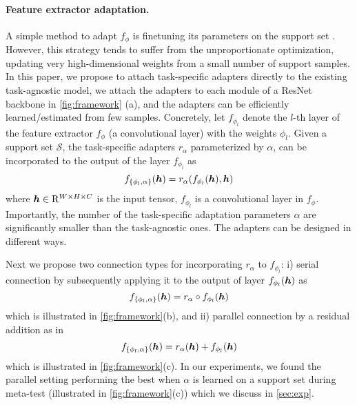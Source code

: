 \paragraph{Feature extractor adaptation.} A simple method to adapt $f_{\phi}$ is finetuning its parameters on the support set \cite{chen2020new,dhillon2019baseline}. 
However, this strategy tends to suffer from the unproportionate optimization, \ie updating very high-dimensional weights from a small number of support samples.
In this paper, we propose to attach task-specific adapters directly to the existing task-agnostic model, \eg we attach the adapters to each module of a ResNet backbone in \cref{fig:framework} (a), and the adapters can be efficiently learned/estimated from few samples.
Concretely, let $f_{\phi_l}$ denote the $l$-th layer of the feature extractor $f_{\phi}$ (\ie a convolutional layer) with the weights $\phi_l$. 
Given a support set $\mathcal{S}$, the task-specific adapters $r_{\alpha}$ parameterized by $\alpha$, can be incorporated to the output of the layer $f_{\phi_l}$ as
\begin{equation}\label{eq:ra}
	f_{\{\phi_l,\alpha\}}(\bm{h}) = r_{\alpha}(f_{\phi_l}(\bm{h}),\bm{h})
\end{equation} where $\bm{h}\in\mathrm{R}^{W\times H \times C}$ is the input tensor, $f_{\phi_l}$ is a convolutional layer in $f_{\phi}$. 
Importantly, the number of the task-specific adaptation parameters $\alpha$ are significantly smaller than the task-agnostic ones.
The adapters can be designed in different ways.

Next we propose two connection types for incorporating $r_\alpha$ to $f_{\phi_l}$: i) serial connection by subsequently applying it to the output of layer $f_{\phi_l}(\bm{h})$ as
\[
    f_{\{\phi_l,\alpha\}}(\bm{h}) = r_{\alpha} \circ f_{\phi_l}(\bm{h})
\] which is illustrated in \cref{fig:framework}(b), and ii) parallel connection by a residual addition as in \cite{rebuffi2018efficient}
\[
    f_{\{\phi_l,\alpha\}}(\bm{h}) = r_{\alpha}(\bm{h}) + f_{\phi_l}(\bm{h})
\] which is illustrated in \cref{fig:framework}(c). 
In our experiments, we found the parallel setting performing the best when $\alpha$ is learned on a support set during meta-test (illustrated in \cref{fig:framework}(c)) which we discuss in \cref{sec:exp}. 

